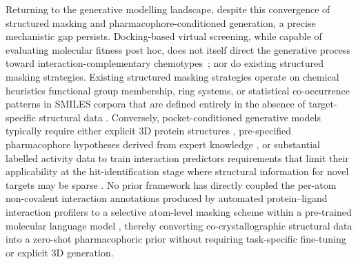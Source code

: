 \documentclass[a4paper,12pt]{article}
\begin{document}
Returning to the generative modelling landscape, despite this convergence of structured masking and pharmacophore-conditioned generation, 
a precise mechanistic gap persists. Docking-based virtual screening, while capable of evaluating molecular fitness
post hoc, does not itself direct the generative process toward interaction-complementary
chemotypes~\cite{Kitchen2004}; nor do existing structured masking strategies. Existing structured masking strategies operate on 
chemical heuristics functional group membership, ring systems, or statistical 
co-occurrence patterns in SMILES corpora that are defined entirely in the absence of 
target-specific structural data \cite{peng2025mlmfg, nguyen2024farm, kruger2025molencoder}. 
Conversely, pocket-conditioned generative models typically require either explicit 3D 
protein structures \cite{peng2022pocket2mol, feng2024lingo3dmol}, pre-specified 
pharmacophore hypotheses derived from expert knowledge \cite{langer2010pharmacophore, 
zhu2023pgmg}, or substantial labelled activity data to train interaction predictors 
\cite{Stokes2020} requirements that limit their applicability at the hit-identification 
stage where structural information for novel targets may be sparse 
\cite{bender2021ai, Jumper2021}. No prior framework has directly coupled the per-atom 
non-covalent interaction annotations produced by automated protein--ligand interaction 
profilers \cite{salentin2015plip, Adasme2021} to a selective atom-level masking scheme 
within a pre-trained molecular language model \cite{chithrananda2020chemberta}, thereby 
converting co-crystallographic structural data into a zero-shot pharmacophoric prior 
without requiring task-specific fine-tuning or explicit 3D generation.
\end{document}
